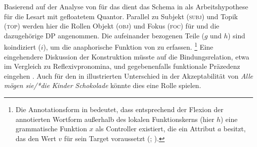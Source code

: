Basierend auf der Analyse von \citet{spector2009} für das  dient das
Schema in  als Arbeits\-hypothese für die Lesart
mit gefloatetem Quantor. Parallel zu Subjekt (\textsc{subj}) und Topik
(\textsc{top}) werden hier die Rollen Objekt (\textsc{obj}) und Fokus
(\textsc{foc}) für  und die dazugehörige DP angenommen. Die
aufeinander bezogenen Teile ($g$ und $h$) sind koindiziert ($i$), um die
anaphorische Funktion von  zu erfassen.%
%
	\footnote{Die Annotationsform  in
		 bedeutet, dass entsprechend der Flexion der
		annotierten Wortform außerhalb des lokalen Funktionskerns (hier $h$)
		eine grammatische Funktion $x$ als Controller existiert, die ein
		Attribut $a$ besitzt, das den Wert $v$ für sein Target voraussetzt
		(;
		\cite[66--70]{bresnanetal2016}).}
%
Eine eingehendere Diskussion der Konstruktion müsste auf die Bindungsrelation,
etwa im Vergleich zu Reflexivpronomina, und gegebenenfalls funktionale
Präzedenz eingehen \autocite[vgl.][213, 254--285]{bresnanetal2016}. Auch für
den in  illustrierten Unterschied in der Akzeptabilität
von \textit{Alle mögen sie/*die Kinder Schokolade} könnte dies eine Rolle
spielen.

